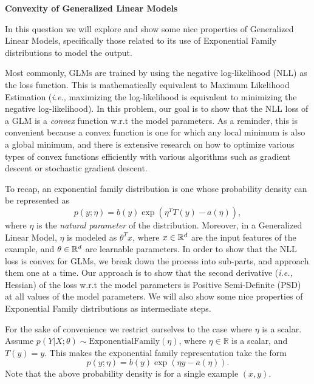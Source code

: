 \item {} {\bf Convexity of Generalized Linear Models}

In this question we will explore and show some nice properties of Generalized
Linear Models, specifically those related to its use of Exponential Family
distributions to model the output.

Most commonly, GLMs are trained by using the negative log-likelihood (NLL) as
the loss function. This is mathematically equivalent to Maximum Likelihood
Estimation (\emph{i.e.,} maximizing the log-likelihood is equivalent to
minimizing the negative log-likelihood). In this problem, our goal is to show
that the NLL loss of a GLM is a \textit{convex} function w.r.t the model parameters. As
a reminder, this is convenient because a convex function is one for which any
local minimum is also a global minimum, and there is extensive research on how
to optimize various types of convex functions efficiently with various algorithms
such as gradient descent or stochastic gradient descent. 

To recap, an exponential family distribution is one whose probability density
can be represented as
%
\begin{equation*}
    p(y; \eta) = b(y)\exp(\eta^TT(y) - a(\eta)),
\end{equation*}
%
where $\eta$ is the \emph{natural parameter} of the distribution. Moreover, in
a Generalized Linear Model, $\eta$ is modeled as $\theta^Tx$, where $x \in
\mathbb{R}^{d}$ are the input features of the example, and $\theta \in
\mathbb{R}^{d}$ are learnable parameters. In order to show that the NLL loss is
convex for GLMs, we break down the process into sub-parts, and approach them
one at a time. Our approach is to show that the second derivative (\emph{i.e.,}
Hessian) of the loss w.r.t the model parameters is Positive Semi-Definite (PSD)
at all values of the model parameters. We will also show some nice properties
of Exponential Family distributions as intermediate steps.

For the sake of convenience we restrict ourselves to the case where $\eta$ is
a scalar. Assume $p(Y|X;\theta )\sim \text{ExponentialFamily}(\eta)$, where
$\eta \in\mathbb{R}$ is a scalar, and $T(y) = y$. This makes the exponential
family representation take the form
%
\begin{equation*}
    p(y ; \eta) = b(y)\exp(\eta y - a(\eta)).
\end{equation*}
%
Note that the above probability density is for a single example $(x,y).$

